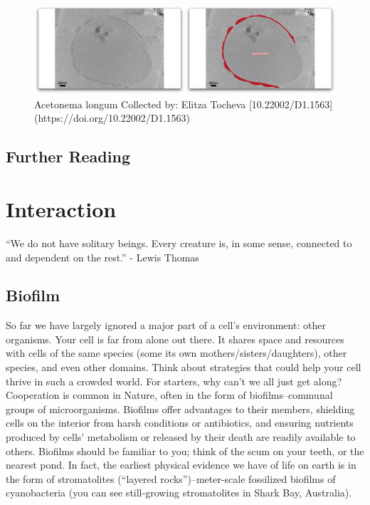 \documentclass[]{tufte-book}
\begin{document}
\begin{figure}
\includegraphics{movie_stills/8_11} \caption[Acetonema longum Collected by]{Acetonema longum Collected by: Elitza Tocheva [10.22002/D1.1563](https://doi.org/10.22002/D1.1563)}\label{fig:unnamed-chunk-150}
\end{figure}

\section{Further Reading}\label{further-reading-7}

\citet{fendrihan2006} \citet{pletnev2015} \citet{tocheva2016}
\citet{vreeland2000}

\chapter{Interaction}\label{interaction}

``We do not have solitary beings. Every creature is, in some sense,
connected to and dependent on the rest.'' - Lewis Thomas
\citet{thomas1974}

\section{Biofilm}\label{biofilm}

So far we have largely ignored a major part of a cell's environment:
other organisms. Your cell is far from alone out there. It shares space
and resources with cells of the same species (some its own
mothers/sisters/daughters), other species, and even other domains. Think
about strategies that could help your cell thrive in such a crowded
world. For starters, why can't we all just get along? Cooperation is
common in Nature, often in the form of biofilms--communal groups of
microorganisms. Biofilms offer advantages to their members, shielding
cells on the interior from harsh conditions or antibiotics, and ensuring
nutrients produced by cells' metabolism or released by their death are
readily available to others. Biofilms should be familiar to you; think
of the scum on your teeth, or the nearest pond. In fact, the earliest
physical evidence we have of life on earth is in the form of
stromatolites (``layered rocks'')--meter-scale fossilized biofilms of
cyanobacteria (you can see still-growing stromatolites in Shark Bay,
Australia).
\end{document}

